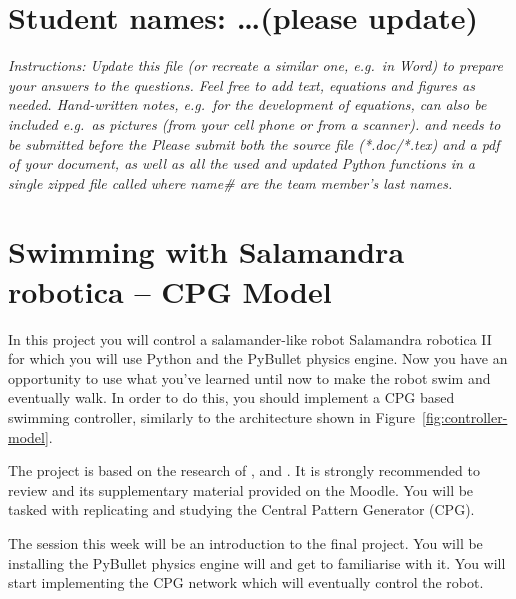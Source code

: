 \documentclass{cmc}
\begin{document}
\pagestyle{fancy}
 

\section*{Student names: \ldots (please update)}

\textit{Instructions: Update this file (or recreate a similar one, e.g.\ in
  Word) to prepare your answers to the questions. Feel free to add text,
  equations and figures as needed. Hand-written notes, e.g.\ for the development
  of equations, can also be included e.g.\ as pictures (from your cell phone or
  from a scanner).  \textbf{} and needs to be
  submitted before the \textbf{} Please submit both the source file (*.doc/*.tex)
  and a pdf of your document, as well as all the used and updated Python
  functions in a single zipped file called
   where name\# are the team
  member’s last names.  }
\\

\section*{Swimming with Salamandra robotica – CPG Model}
\label{sec:exploring-swimming}

In this project you will control a salamander-like robot Salamandra
robotica II for which you will use Python and the PyBullet physics
engine. Now you have an opportunity to use what you’ve learned until
now to make the robot swim and eventually walk. In order to do this,
you should implement a CPG based swimming controller, similarly to the
architecture shown in Figure~\ref{fig:controller-model}.

The project is based on the research of \cite{Crespi2013},
\cite{Karakasiliotis2013} and \cite{ijspeert2007swimming}. It is strongly
recommended to review \cite{ijspeert2007swimming} and its supplementary material
provided on the Moodle. You will be tasked with replicating and
studying the Central Pattern Generator (CPG).

 The session this week will be an introduction to the
final project. You will be installing the PyBullet physics engine will and get
to familiarise with it. You will start implementing the CPG network which will
eventually control the robot.
\end{document}
